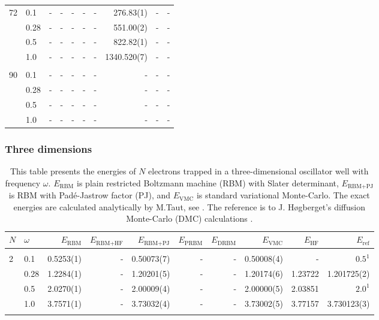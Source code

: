 \begin{landscape}
\begin{table} [H]
\begin{tabularx}{\hsize}{l:l|RRRRRRRR}
		72 & 0.1 & - & - & - & - & - & 276.83(1) & - & - \\ 
		& 0.28 & - & - & - & - & - & 551.00(2) & - & - \\
		& 0.5 & - & - & - & - & - & 822.82(1) & - & - \\
		& 1.0 & - & - & - & - & - & 1340.520(7) & - & - \\ \hdashline \\
		
		90 & 0.1 & - & - & - & - & - & - & - & - \\ 
		& 0.28 & - & - & - & - & - & - & - & - \\
		& 0.5 & - & - & - & - & - & - & - & - \\
		& 1.0 & - & - & - & - & - & - & - & - \\ \hline\hline
	\end{tabularx}
\end{table}

\subsubsection{Three dimensions}
\begin{table} [H]
	\caption{This table presents the energies of $N$ electrons trapped in a three-dimensional oscillator well with frequency $\omega$. $E_{\text{RBM}}$ is plain restricted Boltzmann machine (RBM) with Slater determinant, $E_{\text{RBM+PJ}}$ is RBM with Padé-Jastrow factor (PJ), and $E_{\text{VMC}}$ is standard variational Monte-Carlo. The exact energies are calculated analytically by M.Taut, see \cite{taut_two_1993}. The reference is to J. Høgberget's diffusion Monte-Carlo (DMC) calculations \cite{hogberget_quantum_2013}. } 
	\begin{tabularx}{\hsize}{l:l|RRRRRRRR} \hline\hline
		\label{tab:quantumdotswinteraction3D}
		$N$ & $\omega$ & $E_{\text{RBM}}$ & $E_{\text{RBM+HF}}$ & $E_{\text{RBM+PJ}}$ & $E_{\text{PRBM}}$ & $E_{\text{DRBM}}$ & $E_{\text{VMC}}$ & $E_{\text{HF}} $ & $E_{\text{ref}}$ \\ \hline \\
		2 & 0.1 & 0.5253(1) & - & 0.50073(7) & - & - & 0.50008(4) & - & $0.5^{1}$ \\
		& 0.28 & 1.2284(1) & - & 1.20201(5) & - & - & 1.20174(6) & 1.23722 & 1.201725(2) \\
		& 0.5 & 2.0270(1) & - & 2.00009(4) & - & - & 2.00000(5) & 2.03851 & $2.0^{1}$ \\
		& 1.0 & 3.7571(1) & - & 3.73032(4) & - & - & 3.73002(5) & 3.77157 & 3.730123(3) \\ \hdashline \\
		

\end{tabularx}
\end{table}
\end{landscape}
